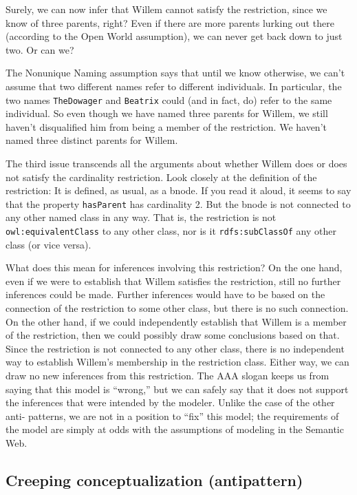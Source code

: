Surely, we can now infer that Willem cannot satisfy the restriction,
since we know of three parents, right? Even if there are more parents
lurking out there (according to the Open World assumption), we can never
get back down to just two. Or can we?

The Nonunique Naming assumption says that until we know otherwise, we
can't assume that two different names refer to different individuals. In
particular, the two names \texttt{TheDowager} and \texttt{Beatrix} could (and in fact, do)
refer to the same individual. So even though we have named three parents
for Willem, we still haven't disqualified him from being a member of the
restriction. We haven't named three distinct parents for Willem.

The third issue transcends all the arguments about whether Willem does
or does not satisfy the
cardinality restriction. Look closely at the definition of the
restriction: It is defined, as usual, as a bnode. If you read it aloud, it seems to say that the property \texttt{hasParent} has cardinality 2. But the bnode is not
connected to any other named class in any way. That is, the restriction
is not \texttt{owl:equivalentClass} to any other class, nor is it \texttt{rdfs:subClassOf}
any other class (or vice versa).

What does this mean for inferences involving this restriction? On the
one hand, even if we were to establish that Willem satisfies the
restriction, still no further inferences could be made. Further
inferences would have to be based on the connection of the restriction
to some other class, but there is no such connection. On the other hand,
if we could independently establish that Willem is a member of the
restriction, then we could possibly draw some conclusions based on that.
Since the restriction is not connected to any other class, there is no
independent way to establish Willem's membership in the restriction
class. Either way, we can draw no new inferences from this restriction.
The AAA slogan keeps us from saying that this model is ``wrong,'' but we
can safely say that it does not support the inferences that were
intended by the modeler. Unlike the case of the other anti- patterns, we
are not in a position to ``fix'' this model; the requirements of the
model are simply at odds with the assumptions of modeling in the
Semantic Web.

\subsection{Creeping conceptualization (antipattern)}

